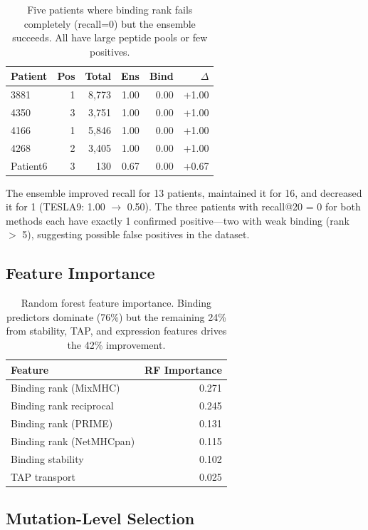 \documentclass[11pt,twocolumn]{article}
\begin{document}
\begin{table}[ht]
\centering
\footnotesize
\begin{tabular}{@{}lrrrrr@{}}
\toprule
Patient & Pos & Total & Ens & Bind & $\Delta$ \\
\midrule
3881 & 1 & 8,773 & 1.00 & 0.00 & +1.00 \\
4350 & 3 & 3,751 & 1.00 & 0.00 & +1.00 \\
4166 & 1 & 5,846 & 1.00 & 0.00 & +1.00 \\
4268 & 2 & 3,405 & 1.00 & 0.00 & +1.00 \\
Patient6 & 3 & 130 & 0.67 & 0.00 & +0.67 \\
\bottomrule
\end{tabular}
\caption{Five patients where binding rank fails completely (recall=0) but the ensemble succeeds. All have large peptide pools or few positives.}
\end{table}

The ensemble improved recall for 13 patients, maintained it for 16, and decreased it for 1 (TESLA9: 1.00 $\to$ 0.50). The three patients with recall@20 = 0 for both methods each have exactly 1 confirmed positive---two with weak binding (rank $>$ 5), suggesting possible false positives in the dataset.

\subsection{Feature Importance}

\begin{table}[ht]
\centering
\footnotesize
\begin{tabular}{@{}lr@{}}
\toprule
Feature & RF Importance \\
\midrule
Binding rank (MixMHC) & 0.271 \\
Binding rank reciprocal & 0.245 \\
Binding rank (PRIME) & 0.131 \\
Binding rank (NetMHCpan) & 0.115 \\
Binding stability & 0.102 \\
TAP transport & 0.025 \\
\bottomrule
\end{tabular}
\caption{Random forest feature importance. Binding predictors dominate (76\%) but the remaining 24\% from stability, TAP, and expression features drives the 42\% improvement.}
\end{table}

\subsection{Mutation-Level Selection}
\end{document}
